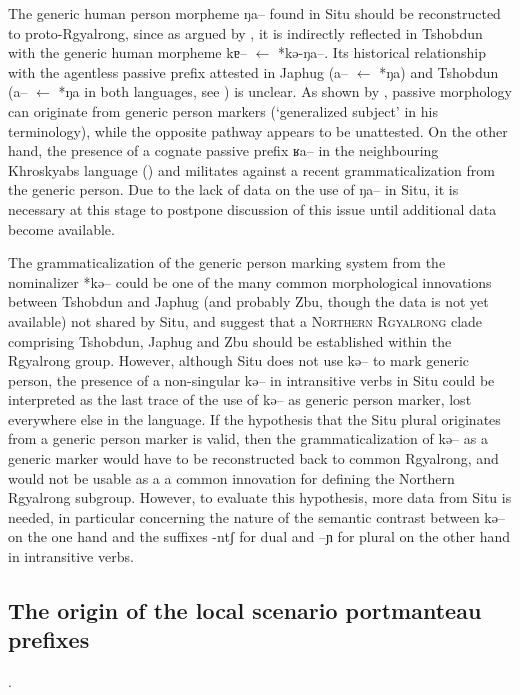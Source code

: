 \documentclass[oldfontcommands,oneside,a4paper,11pt]{article}
\newcommand{\ipa}[1]{{\phon \mbox{#1}}} %
\begin{document}
The generic human person morpheme \ipa{ŋa--} found in Situ should be reconstructed to proto-Rgyalrong, since as argued by  \citet[244]{sun14generic}, it is indirectly reflected in Tshobdun with the generic human morpheme \ipa{kɐ--} $\leftarrow$ *\ipa{kə-ŋa--}. Its historical relationship with the  agentless passive prefix attested in Japhug  (\ipa{a--} $\leftarrow$ *\ipa{ŋa}) and Tshobdun (\ipa{a--} $\leftarrow$ *\ipa{ŋa} in both languages, see \citealt{jacques12demotion}) is unclear. As shown by \citet[49-50]{haspelmath90passive}, passive morphology can originate from generic person markers (`generalized subject' in his terminology), while the opposite pathway appears to be unattested. On the other hand, the presence of a cognate passive prefix \ipa{ʁa--} in the neighbouring Khroskyabs language (\citealt[152-154]{lai13affixale}) and militates against a recent grammaticalization from the generic person. Due to the lack of data on the use of \ipa{ŋa--} in Situ, it is necessary at this stage to postpone discussion of this issue until additional data become available.


The grammaticalization of the generic person marking system from the nominalizer *\ipa{kə--} could be one of the many common morphological innovations between Tshobdun and Japhug (and probably Zbu, though the data is not yet available) not shared by Situ, and suggest that a \textsc{Northern Rgyalrong} clade comprising Tshobdun, Japhug and Zbu should be established within the Rgyalrong group. However, although Situ does not use \ipa{kə--} to mark generic person,  the presence of a non-singular \ipa{kə--} in intransitive verbs in Situ could be interpreted as the last trace of the use of \ipa{kə--} as generic person marker, lost everywhere else in the language. If the hypothesis that the Situ plural originates from a generic person marker is valid, then the grammaticalization  of \ipa{kə--} as a generic marker would have to be reconstructed back to common Rgyalrong, and would not be usable as a a common innovation for defining the Northern Rgyalrong subgroup. However, to evaluate  this hypothesis, more data from Situ is needed, in particular concerning the nature of the semantic contrast between \ipa{kə--} on the one hand and the suffixes \ipa{-ntʃ} for dual and \ipa{--ɲ} for plural on the other hand in intransitive verbs.




\subsection{The origin of the local scenario portmanteau prefixes}
.
\end{document}
